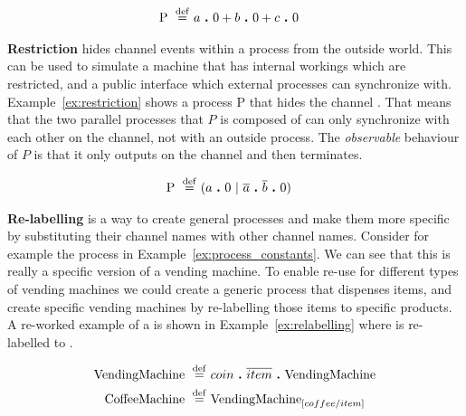 	\begin{Exa}\label{ex:non_determinism}
	\begin{align*}
			\mathrm{P} \ \stackrel{\mathrm{def}}{=}\  & a \ \textbf{.}\  0 + b \ \textbf{.}\  0 + c \ \textbf{.}\  0
	\end{align*}	
	\end{Exa}
	
	\textbf{Restriction} hides channel events within a process from the outside 
	world. This can be used to simulate a machine that has internal workings 
	which are restricted, and a public interface which external processes can	
	synchronize with. Example~\ref{ex:restriction} shows a process P that hides 
	the channel . That means that the two parallel processes that $P$ 
	is composed of can only synchronize with each other on the  
	channel, not with an outside process. The \textit{observable} behaviour of 
	$P$ is that it only outputs on the  channel and then terminates.
	
	\begin{Exa}\label{ex:restriction}
	\begin{align*}
			\mathrm{P} \ \stackrel{\mathrm{def}}{=}\  & (a \ \textbf{.}\  0 \ |\  \overline{a} \ \textbf{.}\  \overline{b} \ \textbf{.}\  0)  			
	\end{align*}	
	\end{Exa}

	\textbf{Re-labelling} is a way to create general processes and make them 
	more specific by substituting their channel names with other channel names. 
	Consider for example the  process in 
	Example~\ref{ex:process_constants}. We can see that this is really a 
	specific version of a vending machine. To enable re-use for different types 
	of vending machines we could create a generic  process 
	that dispenses items, and create specific vending machines by re-labelling 
	those items to specific products. A re-worked example of a 
	 is shown in Example~\ref{ex:relabelling} where 
	 is re-labelled to .
	
	\begin{Exa}\label{ex:relabelling}
	\begin{align*}
			\mathrm{VendingMachine} \ \stackrel{\mathrm{def}}{=}\  & coin \ \textbf{.}\  \overline{item} \ \textbf{.}\  \mathrm{VendingMachine} \\
			\mathrm{CoffeeMachine} \ \stackrel{\mathrm{def}}{=}\  & \mathrm{VendingMachine}_{[coffee/item]}
	\end{align*}	
	\end{Exa}
	
